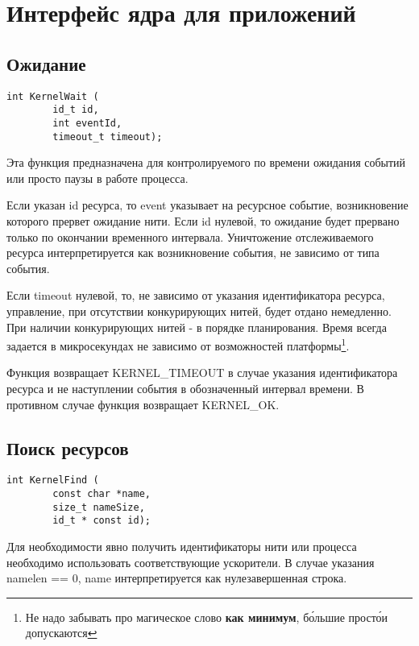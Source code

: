 \section{Интерфейс ядра для приложений}

\subsection{Ожидание}

\begin{verbatim}
int KernelWait (
        id_t id,
        int eventId,
        timeout_t timeout);
\end{verbatim}\par

Эта функция предназначена для контролируемого по времени ожидания событий или
просто паузы в работе процесса.

Если указан id ресурса, то event указывает на ресурсное событие, возникновение
которого прервет ожидание нити. Если id нулевой, то ожидание будет прервано
только по окончании временного интервала. Уничтожение отслеживаемого ресурса
интерпретируется как возникновение события, не зависимо от типа события.

Если timeout нулевой, то, не зависимо от указания идентификатора ресурса,
управление, при отсутствии конкурирующих нитей, будет отдано немедленно. При
наличии конкурирующих нитей - в порядке планирования. Время всегда задается в
микросекундах не зависимо от возможностей платформы\footnote{Не надо забывать
про магическое слово \textbf{как минимум}, б\'{о}льшие прост\'{о}и допускаются}.

Функция возвращает KERNEL\_TIMEOUT в случае указания идентификатора ресурса и
не наступлении события в обозначенный интервал времени. В противном случае
функция возвращает KERNEL\_OK.

\subsection{Поиск ресурсов}

\begin{verbatim}
int KernelFind (
        const char *name,
        size_t nameSize,
        id_t * const id);
\end{verbatim}\par

Для необходимости явно получить идентификаторы нити или процесса необходимо
использовать соответствующие ускорители. В случае указания namelen == 0, name
интерпретируется как нулезавершенная строка.

